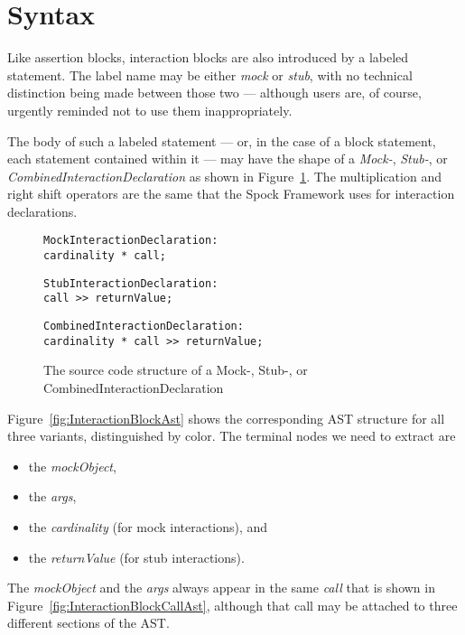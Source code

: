 \section{Syntax}
Like assertion blocks, interaction blocks are also introduced by a labeled statement.
The label name may be either \textit{mock} or \textit{stub},
with no technical distinction being made between those two ---
although users are, of course, urgently reminded not to use them inappropriately.

The body of such a labeled statement
--- or, in the case of a block statement, each statement contained within it ---
may have the shape of a \textit{Mock-}, \textit{Stub-}, or \textit{CombinedInteractionDeclaration}
as shown in Figure~\ref{fig:InteractionBlockVariants}.
The multiplication and right shift operators are the same
that the Spock Framework uses for interaction declarations.

\begin{figure}
  {\color{teal}
    \begin{verbatim}
MockInteractionDeclaration:
cardinality * call;
    \end{verbatim}
  }
  {\color{magenta}
    \begin{verbatim}
StubInteractionDeclaration:
call >> returnValue;
    \end{verbatim}
  }
  {\color{violet}
    \begin{verbatim}
CombinedInteractionDeclaration:
cardinality * call >> returnValue;
    \end{verbatim}
  }
  \caption{
    The source code structure of a Mock-, Stub-, or CombinedInteractionDeclaration
  }\label{fig:InteractionBlockVariants}
\end{figure}

Figure~\ref{fig:InteractionBlockAst} shows the corresponding AST structure
for all three variants, distinguished by color.
The terminal nodes we need to extract are
\begin{itemize}
  \item the \textit{mockObject},
  \item the \textit{args},
  \item the \textit{cardinality} (for mock interactions), and
  \item the \textit{returnValue} (for stub interactions).
\end{itemize}
The \textit{mockObject} and the \textit{args} always appear
in the same  \textit{call}
that is shown in Figure~\ref{fig:InteractionBlockCallAst},
although that call may be attached to three different sections of the AST.

